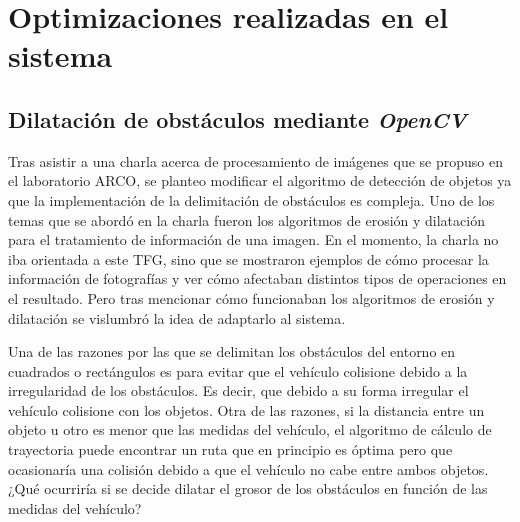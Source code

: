 \section{Optimizaciones realizadas en el sistema}\label{sec:Optimizaciones}

\subsection{Dilatación de obstáculos mediante \emph{OpenCV}}\label{sec:DilatacionObjetos}

Tras asistir a una charla acerca de procesamiento de imágenes que se propuso en el laboratorio ARCO, se planteo modificar el algoritmo de detección de objetos ya que la implementación de la delimitación de obstáculos es compleja. Uno de los temas que se abordó en la charla fueron los algoritmos de erosión y dilatación para el tratamiento de información de una imagen. En el momento, la charla no iba orientada a este \ac{TFG}, sino que se mostraron ejemplos de cómo procesar la información de fotografías y ver cómo afectaban distintos tipos de operaciones en el resultado. Pero tras mencionar cómo funcionaban los algoritmos de erosión y dilatación se vislumbró la idea de adaptarlo al sistema.

Una de las razones por las que se delimitan los obstáculos del entorno en cuadrados o rectángulos es para evitar que el vehículo colisione debido a la irregularidad de los obstáculos. Es decir, que debido a su forma irregular el vehículo colisione con los objetos. Otra de las razones, si la distancia entre un objeto u otro es menor que las medidas del vehículo, el algoritmo de cálculo de trayectoria puede encontrar un ruta que en principio es óptima pero que ocasionaría una colisión debido a que el vehículo no cabe entre ambos objetos. ¿Qué ocurriría si se decide dilatar el grosor de los obstáculos en función de las medidas del vehículo? 

